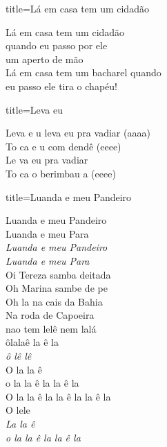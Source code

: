 \documentclass[fontsize=14pt, twoside]{scrreprt}
\begin{document}
\begin{multicols*}{2}
\begin{song}{title={Lá em casa tem um cidadão}}
        \begin{verse*}
            Lá em casa tem um cidadão\\
            quando eu passo por ele \\ 
            um aperto de mão\\
            Lá em casa tem um bacharel quando\\
            eu passo ele tira o chapéu!\\
        \end{verse*}
\end{song}
\columnbreak
\begin{song}{title={Leva eu}}
        \begin{verse*}
            Leva e u leva eu pra vadiar (aaaa)\\
            To ca e u \berimbau com dendê (eeee)\\
            Le va eu pra vadiar\\
            To ca o berimbau a (eeee)\\
        \end{verse*}
\end{song}

\begin{song}{title={Luanda e meu Pandeiro}}
        \begin{verse*}
            Luanda e meu Pandeiro\\
            Luanda e meu Para\\
            \textit{Luanda e meu Pandeiro}\\
            \textit{Luanda e meu Para}\\
            Oi Tereza samba deitada\\
            Oh Marina sambe de pe\\
            Oh la na cais da Bahia\\
            Na roda de Capoeira\\
            nao tem lelê nem lalá\\
            ôlalaê la ê la\\
            \textit{ô lê lê}\\
            O la la ê\\
            o la la ê la la ê la\\
            O la la ê la la ê la la ê la\\
            O lele\\
            \textit{La la ê}\\
            \textit{o la la ê la la ê la}\\
        \end{verse*}
\end{song}


\end{multicols*}
\end{document}
